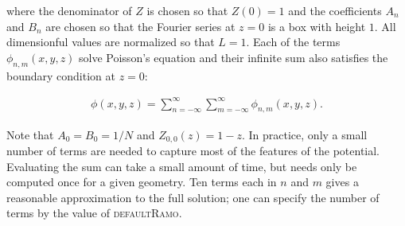 \documentclass[12pt]{article}
\begin{document}
\noindent where the denominator of $Z$ is chosen so that $Z(0)=1$ and the coefficients $A_n$ and $B_n$ are chosen so that the Fourier series at $z=0$ is a box with height $1$.  All dimensionful values are normalized so that $L=1$.  Each of the terms $\phi_{n,m}(x,y,z)$ solve Poisson's equation and their infinite sum also satisfies the boundary condition at $z=0$:

\begin{align}
\phi(x,y,z)=\sum_{n=-\infty}^\infty\sum_{m=-\infty}^\infty \phi_{n,m}(x,y,z).
\end{align}

\noindent Note that $A_0=B_0=1/N$ and $Z_{0,0}(z)=1-z$.  In practice, only a small number of terms are needed to capture most of the features of the potential.  Evaluating the sum can take a small amount of time, but needs only be computed once for a given geometry. Ten terms each in $n$ and $m$ gives a reasonable approximation to the full solution; one can specify the number of terms by the value of \textsc{defaultRamo}.


{}
\end{document}
